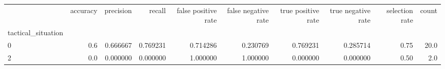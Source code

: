 \begin{tabular}{lrrrrrrrrr}
\toprule
{} &  accuracy &  precision &    recall &  false positive rate &  false negative rate &  true positive rate &  true negative rate &  selection rate &  count \\
tactical\_situation &           &            &           &                      &                      &                     &                     &                 &        \\
\midrule
0                  &       0.6 &   0.666667 &  0.769231 &             0.714286 &             0.230769 &            0.769231 &            0.285714 &            0.75 &   20.0 \\
2                  &       0.0 &   0.000000 &  0.000000 &             1.000000 &             1.000000 &            0.000000 &            0.000000 &            0.50 &    2.0 \\
\bottomrule
\end{tabular}
